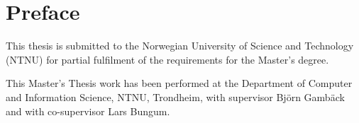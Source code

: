 \section*{Preface}

This thesis is submitted to the Norwegian University of Science and Technology (NTNU) for partial fulfilment of the requirements for the Master's degree.

This Master's Thesis work has been performed at the Department of Computer and Information Science, NTNU, Trondheim, with supervisor Bj\"{o}rn Gamb\"{a}ck and with co-supervisor Lars Bungum.



\cleardoublepage